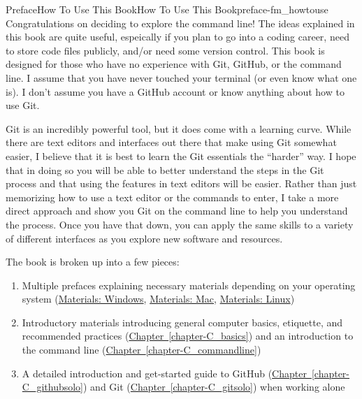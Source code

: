 \documentclass[oneside,10pt,]{book}
\newcommand{\xreffont}{\relax}
\begin{document}
%
%
\typeout{************************************************}
\typeout{************************************************}
%
\begin{preface}{Preface}{How To Use This Book}{}{How To Use This Book}{}{}{preface-fm_howtouse}
Congratulations on deciding to explore the command line! The ideas explained in this book are quite useful, espeically if you plan to go into a coding career, need to store code files publicly, and\slash{}or need some version control. This book is designed for those who have no experience with Git, GitHub, or the command line. I assume that you have never touched your terminal (or even know what one is). I don't assume you have a GitHub account or know anything about how to use Git.%
\par
Git is an incredibly powerful tool, but it does come with a learning curve. While there are text editors and interfaces out there that make using Git somewhat easier, I believe that it is best to learn the Git essentials the ``harder'' way. I hope that in doing so you will be able to better understand the steps in the Git process and that using the features in text editors will be easier. Rather than just memorizing how to use a text editor or the commands to enter, I take a more direct approach and show you Git on the command line to help you understand the process. Once you have that down, you can apply the same skills to a variety of different interfaces as you explore new software and resources.%
\par
The book is broken up into a few pieces:%
\begin{enumerate}
\item{}Multiple prefaces explaining necessary materials depending on your operating system (\hyperref[preface-materials-windows]{Materials: Windows}, \hyperref[preface-materials-mac]{Materials: Mac}, \hyperref[preface-materials-linux]{Materials: Linux})%
\item{}Introductory materials introducing general computer basics, etiquette, and recommended practices (\hyperref[chapter-C_basics]{Chapter~{\xreffont\ref{chapter-C_basics}}}) and an introduction to the command line (\hyperref[chapter-C_commandline]{Chapter~{\xreffont\ref{chapter-C_commandline}}})%
\item{}A detailed introduction and get-started guide to GitHub (\hyperref[chapter-C_githubsolo]{Chapter~{\xreffont\ref{chapter-C_githubsolo}}}) and Git (\hyperref[chapter-C_gitsolo]{Chapter~{\xreffont\ref{chapter-C_gitsolo}}}) when working alone%

\end{enumerate}
\end{preface}
\end{document}
